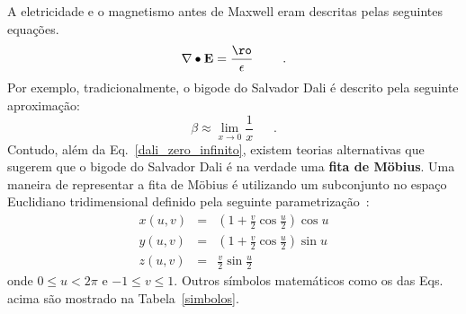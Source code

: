 \documentclass[a4wide]{report}
\begin{document}
	A eletricidade e o magnetismo antes de Maxwell eram descritas pelas seguintes equações.
\begin{equation}
{\bf \nabla} \bullet {\bf E} = \frac{\ro}{\epsilon}
~~~~~~~.
\label{dali_zero_infinito}
\end{equation}
	Por exemplo, tradicionalmente, o bigode do Salvador Dali é descrito pela
seguinte aproximação:
\begin{equation}
\beta \approx \lim_{x\to 0} \frac{1}{x}
~~~~~~~.
\label{dali_zero_infinito}
\end{equation}
	Contudo, além da Eq.~\ref{dali_zero_infinito}, existem teorias alternativas 
que sugerem que o bigode do Salvador Dali é na verdade uma {\bf fita de M\"obius}.
	Uma maneira de representar a fita de M\"obius é utilizando um subconjunto 
no espaço Euclidiano tridimensional definido pela seguinte parametrização~\cite{mobius}:
\begin{eqnarray}
x(u,v) &=& \left( 1 + \frac{v}{2} \cos \frac{u}{2} \right) \cos u \label{mobius_strip_a} \\
y(u,v) &=& \left( 1 + \frac{v}{2} \cos \frac{u}{2} \right) \sin u \label{mobius_strip_b} \\
z(u,v) &=& \frac{v}{2} \sin \frac{u}{2} \label{mobius_strip_c}
\end{eqnarray}
onde $0\leq u < 2\pi$ e $-1\leq v \leq 1$. 
	Outros símbolos matemáticos como os das Eqs. acima são mostrado na Tabela~\ref{simbolos}.
\end{document}
